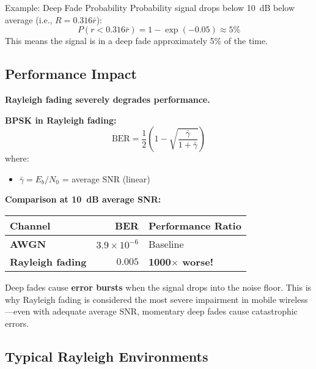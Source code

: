 \begin{calloutbox}{Example: Deep Fade Probability}
Probability signal drops below 10~dB below average (i.e., $R = 0.316\bar{r}$):
\begin{equation*}
P(r < 0.316\bar{r}) = 1 - \exp(-0.05) \approx 5\%
\end{equation*}
This means the signal is in a deep fade approximately 5\% of the time.
\end{calloutbox}

\subsection{Performance Impact}

\textbf{Rayleigh fading severely degrades performance.}

\textbf{BPSK in Rayleigh fading:}
\begin{equation}
\text{BER} = \frac{1}{2}\left(1 - \sqrt{\frac{\bar{\gamma}}{1 + \bar{\gamma}}}\right)
\label{eq:bpsk-rayleigh-ber}
\end{equation}
where:
\begin{itemize}
\item $\bar{\gamma} = E_b/N_0$ = average SNR (linear)
\end{itemize}

\textbf{Comparison at 10~dB average SNR:}
\begin{center}
\begin{tabular}{@{}lrl@{}}
\toprule
Channel & BER & Performance Ratio \\
\midrule
\textbf{AWGN} & $3.9 \times 10^{-6}$ & Baseline \\
\textbf{Rayleigh fading} & $0.005$ & \textbf{1000$\times$ worse!} \\
\bottomrule
\end{tabular}
\end{center}

\begin{keyconcept}
Deep fades cause \textbf{error bursts} when the signal drops into the noise floor. This is why Rayleigh fading is considered the most severe impairment in mobile wireless---even with adequate average SNR, momentary deep fades cause catastrophic errors.
\end{keyconcept}

\subsection{Typical Rayleigh Environments}

